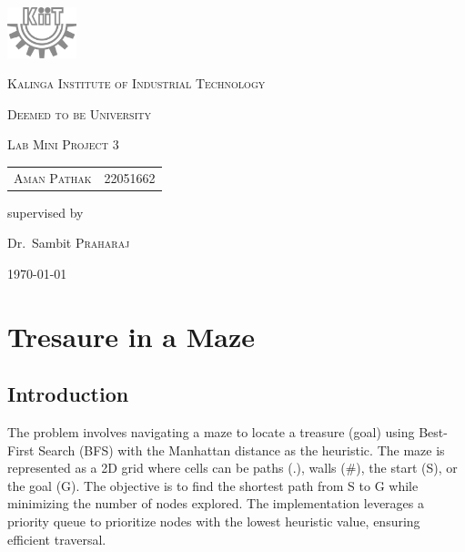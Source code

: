 \documentclass{report}
\begin{document}
	\begin{titlepage}
		\centering
		\includegraphics[width=0.15\textwidth]{./assets/bw_kiit.png}\par\vspace{1cm}
		{\LARGE \textsc{Kalinga Institute of Industrial Technology}\par}
		{\textsc{Deemed to be University}\par}
		\vspace{1cm}
		{\Large \textsc{Lab Mini Project 3}\par}
		\vspace{1.5cm}
		{\huge{}\par}
		\vspace{1cm}
		\begin{tabular}{ll}
			\textsc{Aman Pathak}       & 22051662 \\
		\end{tabular}
		\vspace{0.5cm}					
		\vfill
		supervised by\par
		Dr.~Sambit \textsc{Praharaj}
		
		\vfill
		
		{\large \today\par}
	\end{titlepage}





\chapter{Tresaure in a Maze}
\section{Introduction}
The problem involves navigating a maze to locate a treasure (goal) using Best-First Search (BFS) with the Manhattan distance as the heuristic. The maze is represented as a 2D grid where cells can be paths (.), walls (\#), the start (S), or the goal (G). The objective is to find the shortest path from S to G while minimizing the number of nodes explored. The implementation leverages a priority queue to prioritize nodes with the lowest heuristic value, ensuring efficient traversal.
\end{document}
